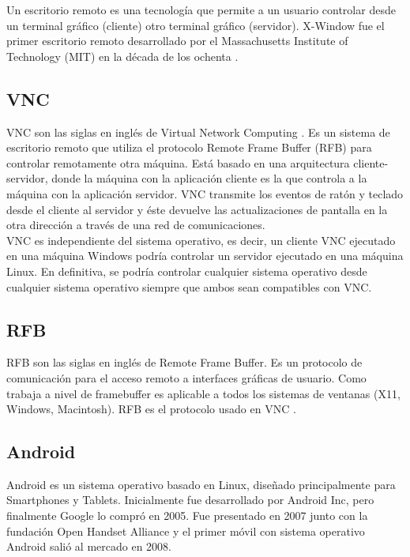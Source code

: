 Un escritorio remoto es una tecnología que permite a un usuario controlar desde un terminal gráfico (cliente) otro terminal gráfico (servidor). X-Window fue el primer escritorio remoto desarrollado por el Massachusetts Institute of Technology (MIT) en la década de los ochenta \cite{wiki:er}.

\subsection{VNC}

VNC son las siglas en inglés de Virtual Network Computing \cite{wiki:vnc}. Es un sistema de escritorio remoto que utiliza el protocolo Remote Frame Buffer (RFB) para controlar remotamente otra máquina. Está basado en una arquitectura cliente-servidor, donde la máquina con la aplicación cliente es la que controla a la máquina con la aplicación servidor. VNC transmite los eventos de ratón y teclado desde el cliente al servidor y éste devuelve las actualizaciones de pantalla en la otra dirección a través de una red de comunicaciones.\\

VNC es independiente del sistema operativo, es decir, un cliente VNC ejecutado en una máquina Windows podría controlar un servidor ejecutado en una máquina Linux. En definitiva, se podría controlar cualquier sistema operativo desde cualquier sistema operativo siempre que ambos sean compatibles con VNC.

\subsection{RFB}

RFB son las siglas en inglés de Remote Frame Buffer. Es un protocolo de comunicación para el acceso remoto a interfaces gráficas de usuario. Como trabaja a nivel de framebuffer es aplicable a todos los sistemas de ventanas (X11, Windows, Macintosh). RFB es el protocolo usado en VNC \cite{RFB:RFB}.

\subsection{Android}

Android es un sistema operativo basado en Linux, diseñado principalmente para Smartphones y Tablets. Inicialmente fue desarrollado por Android Inc, pero finalmente Google lo compró en 2005. Fue presentado en 2007 junto con la fundación Open Handset Alliance y el primer móvil con sistema operativo Android salió al mercado en 2008.\\

